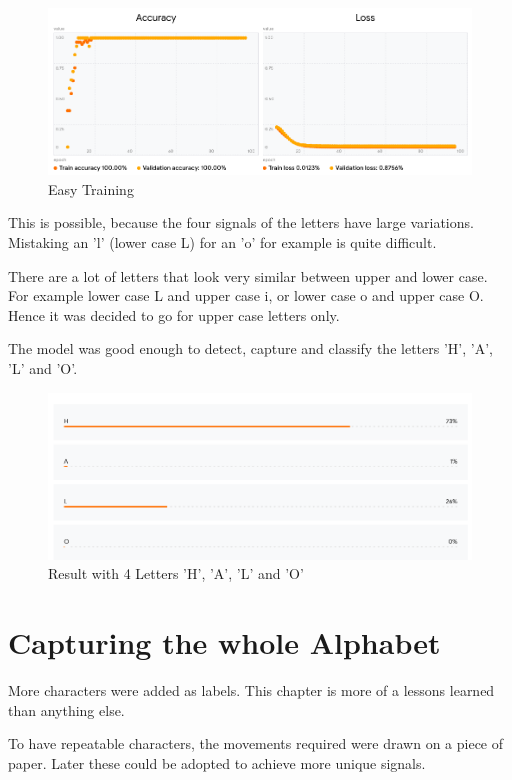 \documentclass[a4paper,titlepage]{article}
\begin{document}
\begin{figure}[H]
    \includegraphics[width=\textwidth]{very_fast_training_reults_HALO.png}
    \caption{Easy Training}
\end{figure}

\newpage
This is possible, because the four signals of the letters have large variations.
Mistaking an 'l' (lower case L) for an 'o' for example is quite difficult.

There are a lot of letters that look very similar between upper and lower case.
For example lower case L and upper case i, or lower case o and upper case O.
Hence it was decided to go for upper case letters only.

The model was good enough to detect, capture and classify the letters 'H', 'A', 'L' and 'O'.

\begin{figure}[H]
    \includegraphics[width=\textwidth]{result_HALO.png}
    \caption{Result with 4 Letters 'H', 'A', 'L' and 'O'}
\end{figure}

\newpage
\section{Capturing the whole Alphabet}

More characters were added as labels.
This chapter is more of a lessons learned than anything else.

To have repeatable characters, the movements required were drawn on a piece of paper.
Later these could be adopted to achieve more unique signals.
\end{document}
